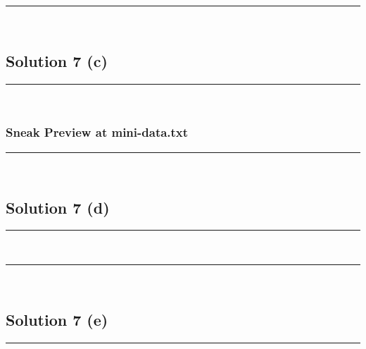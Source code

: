 \documentclass{article}
\begin{document}
\begin{lstlisting}

\end{lstlisting}


\noindent\rule{\textwidth}{0.4pt}\\

\newpage

\subsection*{Solution 7 (c)}
\noindent\rule{\textwidth}{0.4pt}\\

\subsubsection*{Sneak Preview at mini-data.txt}

\noindent\rule{\textwidth}{0.4pt}\\

\newpage

\subsection*{Solution 7 (d)}
\noindent\rule{\textwidth}{0.4pt}\\

\noindent\rule{\textwidth}{0.4pt}\\

\newpage

\subsection*{Solution 7 (e)}
\noindent\rule{\textwidth}{0.4pt}\\
\end{document}
